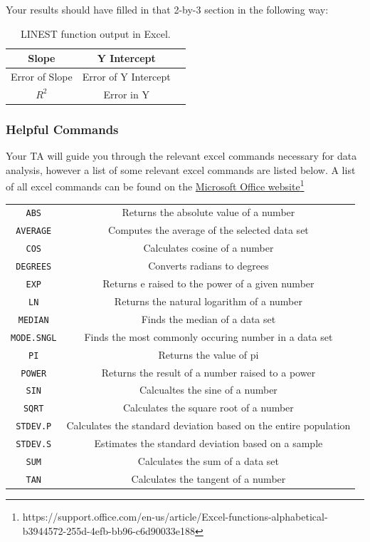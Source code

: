Your results should have filled in that 2-by-3 section in the following way:
\begin {table}[H]
\begin{center}
\begin{tabular}{ |c | c | c |}
\hline
Slope 		& Y Intercept \\ \hline
Error of Slope 	& Error of Y Intercept \\ \hline
$R^2$ 		& Error in Y \\ \hline
\end{tabular}
\caption{LINEST function output in Excel.}
\end{center}
\end{table}

\subsubsection{Helpful Commands}

Your TA will guide you through the relevant excel commands necessary for data analysis, however a list of some relevant excel commands are listed below. A list of all excel commands can be found on the \href{https://support.office.com/en-us/article/Excel-functions-alphabetical-b3944572-255d-4efb-bb96-c6d90033e188}{Microsoft Office website}\footnote{https://support.office.com/en-us/article/Excel-functions-alphabetical-b3944572-255d-4efb-bb96-c6d90033e188}

\begin{center}
\begin{tabular}{c | c}
\texttt{ABS} & Returns the absolute value of a number \\
\texttt{AVERAGE} & Computes the average of the selected data set \\
\texttt{COS} & Calculates cosine of a number\\
\texttt{DEGREES} & Converts radians to degrees \\
\texttt{EXP} & Returns e raised to the power of a given number \\
\texttt{LN} & Returns the natural logarithm of a number \\
\texttt{MEDIAN} & Finds the median of a data set \\
\texttt{MODE.SNGL} & Finds the most commonly occuring number in a data set\\
\texttt{PI} & Returns the value of pi\\
\texttt{POWER} & Returns the result of a number raised to a power\\
\texttt{SIN} & Calcualtes the sine of a number\\
\texttt{SQRT} & Calculates the square root of a number\\
\texttt{STDEV.P} & Calculates the standard deviation based on the entire population \\
\texttt{STDEV.S} & Estimates the standard deviation based on a sample \\
\texttt{SUM} & Calculates the sum of a data set\\
\texttt{TAN} & Calculates the tangent of a number
\end{tabular}
\end{center}

